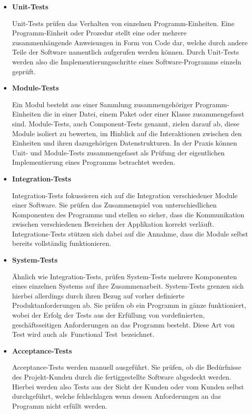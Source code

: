 \begin{itemize}
    \item {
        \textbf{Unit-Tests}\par
        Unit-Tests prüfen das Verhalten von einzelnen Programm-Einheiten.
        Eine Programm-Einheit oder Prozedur stellt eine oder mehrere zusammenhängende Anweisungen in Form von Code dar,
        welche durch andere Teile der Software namentlich aufgerufen werden können.
        Durch Unit-Tests werden also die Implementierungsschritte eines Software-Programms einzeln geprüft.
    }

    \item {
        \textbf{Module-Tests}\par
        Ein Modul besteht aus einer Sammlung zusammengehöriger Programm-Einheiten die in einer Datei, einem Paket oder
        einer Klasse zusammengefasst sind.
        Module-Tests, auch Component-Tests genannt, zielen darauf ab, diese Module isoliert zu bewerten, im Hinblick auf
        die Interaktionen zwischen den Einheiten und ihren dazugehörigen Datenstrukturen.
        In der Praxis können Unit- und Module-Tests zusammengefasst als Prüfung der eigentlichen Implementierung eines
        Programms betrachtet werden.
    }

    \item {
        \textbf{Integration-Tests}\par
        Integration-Tests fokussieren sich auf die Integration verschiedener Module einer Software.
        Sie prüfen das Zusammenspiel von unterschiedlichen Komponenten des Programms und stellen so sicher, dass die
        Kommunikation zwischen verschiedenen Bereichen der Applikation korrekt verläuft.
        Integrations-Tests stützen sich dabei auf die Annahme, dass die Module selbst bereits vollständig funktionieren.
    }

    \item {
        \textbf{System-Tests}\par
        Ähnlich wie Integration-Tests, prüfen System-Tests mehrere Komponenten eines einzelnen Systems auf ihre
        Zusammenarbeit.
        System-Tests grenzen sich hierbei allerdings durch ihren Bezug auf vorher definierte Produktanforderungen ab.
        Sie prüfen ob ein Programm in gänze funktioniert, wobei der Erfolg der Tests aus der Erfüllung von
        vordefinierten, geschäftsseitigen Anforderungen an das Programm besteht.
        Diese Art von Test wird auch als\ \glqq Functional Test\grqq\ bezeichnet.
    }

    \item {
        \textbf{Acceptance-Tests}\par
        Acceptance-Tests werden manuell ausgeführt.
        Sie prüfen, ob die Bedürfnisse des Projekt-Kunden durch die fertiggestellte Software abgedeckt werden.
        Hierbei werden also Tests aus der Sicht der Kunden oder vom Kunden selbst durchgeführt, welche fehlschlagen
        wenn dessen Anforderungen an das Programm nicht erfüllt werden.
    }
\end{itemize}

